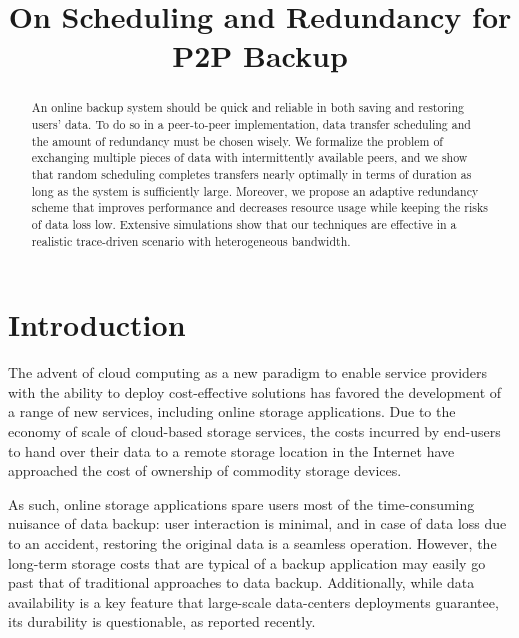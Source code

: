 \documentclass[conference,10pt]{IEEEtran}
\begin{document}
\title{On Scheduling and Redundancy for P2P Backup}

\author{
}

\maketitle

\begin{abstract}

An online backup system should be quick and reliable in both saving
and restoring users' data. To do so in a peer-to-peer implementation,
data transfer scheduling and the amount of redundancy must be chosen
wisely. We formalize the problem of exchanging multiple pieces of data
with intermittently available peers, and we show that random
scheduling completes transfers nearly optimally in terms of duration
as long as the system is sufficiently large. Moreover, we propose an
adaptive redundancy scheme that improves performance and decreases
resource usage while keeping the risks of data loss low.  Extensive
simulations show that our techniques are effective in a realistic
trace-driven scenario with heterogeneous bandwidth.

\end{abstract}


\section{Introduction}

The advent of cloud computing as a new paradigm to enable service providers with the ability to deploy cost-effective solutions has favored the development of a range of new services, including online storage applications. Due to the economy of scale of cloud-based storage services, the costs incurred by end-users to hand over their data to a remote storage location in the Internet have approached the cost of ownership of commodity storage devices.

As such, online storage applications spare users most of the
time-consuming nuisance of data backup: user interaction is minimal,
and in case of data loss due to an accident, restoring the original
data is a seamless operation.  However, the long-term storage costs that
are typical of a backup application may easily go past that of
traditional approaches to data backup. Additionally, while data
availability is a key feature that large-scale data-centers
deployments guarantee, its durability is questionable, as reported
recently\cite{carbonite}.
\end{document}
